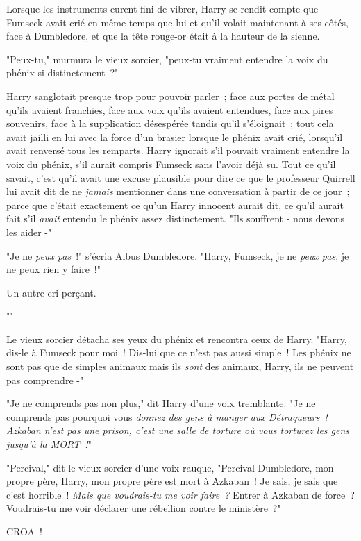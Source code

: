 Lorsque les instruments eurent fini de vibrer, Harry se rendit compte que Fumseck avait crié en même temps que lui et qu'il volait maintenant à ses côtés, face à Dumbledore, et que la tête rouge-or était à la hauteur de la sienne.

"Peux-tu," murmura le vieux sorcier, "peux-tu vraiment entendre la voix du phénix si distinctement~?"

Harry sanglotait presque trop pour pouvoir parler~; face aux portes de métal qu'ils avaient franchies, face aux voix qu'ils avaient entendues, face aux pires souvenirs, face à la supplication désespérée tandis qu'il s'éloignait~; tout cela avait jailli en lui avec la force d'un brasier lorsque le phénix avait crié, lorsqu'il avait renversé tous les remparts. Harry ignorait s'il pouvait vraiment entendre la voix du phénix, s'il aurait compris Fumseck sans l'avoir déjà su. Tout ce qu'il savait, c'est qu'il avait une excuse plausible pour dire ce que le professeur Quirrell lui avait dit de ne \emph{jamais} mentionner dans une conversation à partir de ce jour~; parce que c'était exactement ce qu'un Harry innocent aurait dit, ce qu'il aurait fait s'il \emph{avait} entendu le phénix assez distinctement. "Ils souffrent - nous devons les aider -"

"Je ne \emph{peux pas}~!" s'écria Albus Dumbledore. "Harry, Fumseck, je ne \emph{peux pas}, je ne peux rien y faire~!"

Un autre cri perçant.

""

Le vieux sorcier détacha ses yeux du phénix et rencontra ceux de Harry. "Harry, dis-le à Fumseck pour moi~! Dis-lui que ce n'est pas aussi simple~! Les phénix ne sont pas que de simples animaux mais ils \emph{sont} des animaux, Harry, ils ne peuvent pas comprendre -"

"Je ne comprends pas non plus," dit Harry d'une voix tremblante. "Je ne comprends pas pourquoi vous \emph{donnez des gens à manger aux Détraqueurs~! Azkaban n'est pas une prison, c'est une salle de torture où vous torturez les gens jusqu'à la MORT~!}"

"Percival," dit le vieux sorcier d'une voix rauque, "Percival Dumbledore, mon propre père, Harry, mon propre père est mort à Azkaban~! Je sais, je sais que c'est horrible~! \emph{Mais que voudrais-tu me voir faire~?} Entrer à Azkaban de force~? Voudrais-tu me voir déclarer une rébellion contre le ministère~?"

CROA~!

